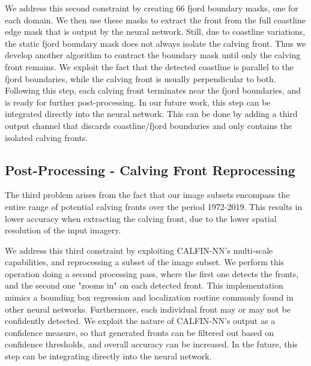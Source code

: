 \documentclass[tc, manuscript]{copernicus}
\begin{document}
We address this second constraint by creating 66 fjord boundary masks, one for each domain. We then use these masks to extract the front from the full coastline edge mask that is output by the neural network. Still, due to coastline variations, the static fjord boundary mask does not always isolate the calving front. Thus we develop another algorithm to contract the boundary mask until only the calving front remains. We exploit the fact that the detected coastline is parallel to the fjord boundaries, while the calving front is usually perpendicular to both. Following this step, each calving front terminates near the fjord boundaries, and is ready for further post-processing. In our future work, this step can be integrated directly into the neural network. This can be done by adding a third output channel that discards coastline/fjord boundaries and only contains the isolated calving fronts.





\subsection{Post-Processing - Calving Front Reprocessing}
The third problem arises from the fact that our image subsets encompass the entire range of potential calving fronts over the period 1972-2019. This results in lower accuracy when extracting the calving front, due to the lower spatial resolution of the input imagery.

We address this third constraint by exploiting CALFIN-NN's multi-scale capabilities, and reprocessing a subset of the image subset. We perform this operation doing a second processing pass, where the first one detects the fronts, and the second one "zooms in" on each detected front. This implementation mimics a bounding box regression and localization routine commonly found in other neural networks. Furthermore, each individual front may or may not be confidently detected. We exploit the nature of CALFIN-NN's output as a confidence measure, so that generated fronts can be filtered out based on confidence thresholds, and overall accuracy can be increased. In the future, this step can be integrating directly into the neural network. 
\end{document}
